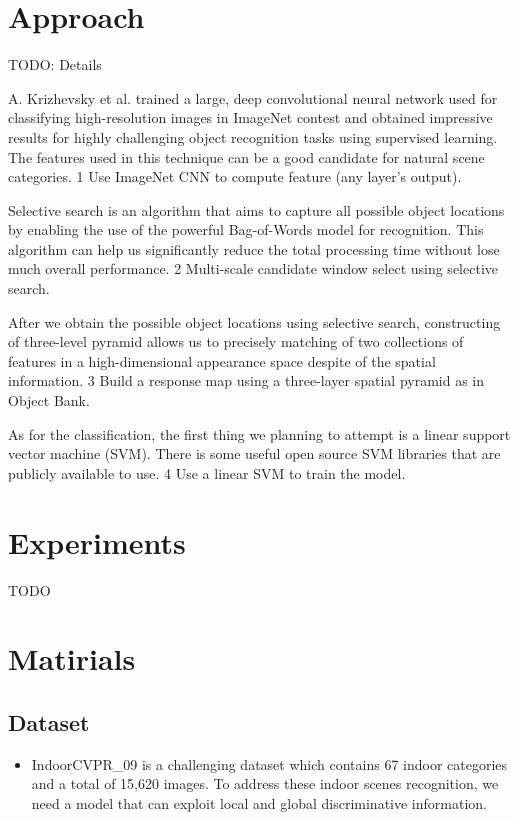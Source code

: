 \documentclass[letterpaper,twocolumn,11pt]{article}
\begin{document}
\section{Approach}
TODO: Details
\par
	A. Krizhevsky et al.\cite{CNN} trained a large, deep convolutional neural
	network used for classifying high-resolution images in ImageNet contest
	and obtained impressive results for highly challenging object recognition
	tasks using	supervised learning. The features used in this technique can
	be a good candidate for natural scene categories.
    1 Use ImageNet CNN to compute feature (any layer's output).

\par
	Selective search\cite{SS} is an algorithm that aims to capture all possible
	object locations by enabling the use of the powerful Bag-of-Words model
	for recognition. This algorithm can help us significantly reduce the total
	processing time without lose much overall performance.
    2 Multi-scale candidate window select using selective search.

\par
	After we obtain the possible object locations using selective search,
	constructing of three-level pyramid allows us to precisely matching of two
	collections of features in a high-dimensional appearance space despite
	of the spatial information.\cite{SPM}
    3 Build a response map using a three-layer spatial pyramid as in Object Bank.

\par
	As for the classification, the first thing we planning to attempt is a
	linear support vector machine (SVM).\cite{SVM} There is some useful
	open source SVM libraries that are publicly available to use.
    4 Use a linear SVM to train the model.

\section{Experiments}
TODO

\section{Matirials}
	\subsection{Dataset}
	\begin{itemize}
	\item{IndoorCVPR\_09} is a challenging dataset which contains 67
	indoor categories and a total of 15,620 images. To address these indoor
	scenes recognition, we need a model	that can exploit local and global
	discriminative information.\cite{DATA}
	\end{itemize}
\end{document}
